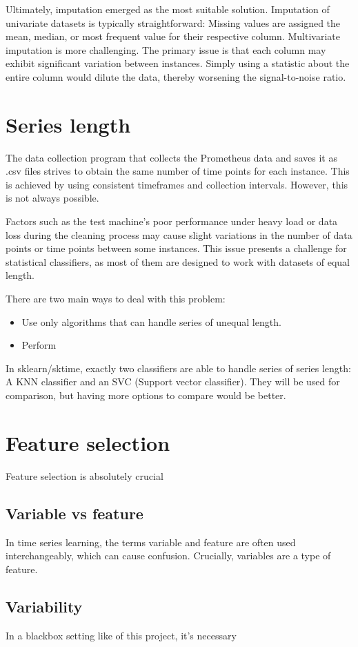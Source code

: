 Ultimately, imputation emerged as the most suitable solution. Imputation of univariate datasets is typically straightforward: Missing values are assigned the mean, median, or most frequent value for their respective column. Multivariate imputation is more challenging. The primary issue is that each column may exhibit significant variation between instances. Simply using a statistic about the entire column would dilute the data, thereby worsening the signal-to-noise ratio.
\section{Series length}
The data collection program that collects the Prometheus data and saves it as .csv files strives to obtain the same number of time points for each instance. This is achieved by using consistent timeframes and collection intervals. However, this is not always possible.

Factors such as the test machine's poor performance under heavy load or data loss during the cleaning process may cause slight variations in the number of data points or time points between some instances. This issue presents a challenge for statistical classifiers, as most of them are designed to work with datasets of equal length.

There are two main ways to deal with this problem:
\begin{itemize}
    \item Use only algorithms that can handle series of unequal length. 
    \item Perform 
\end{itemize}

In sklearn/sktime, exactly two classifiers are able to handle series of series length: A KNN classifier and an SVC (Support vector classifier). They will be used for comparison, but having more options to compare would be better.

\section{Feature selection}
Feature selection is absolutely crucial 


\subsection{Variable vs feature}
In time series learning, the terms variable and feature are often used interchangeably, which can cause confusion. 
Crucially, variables are a type of feature. 

\subsection{Variability}
In a blackbox setting like of this project, it's necessary 